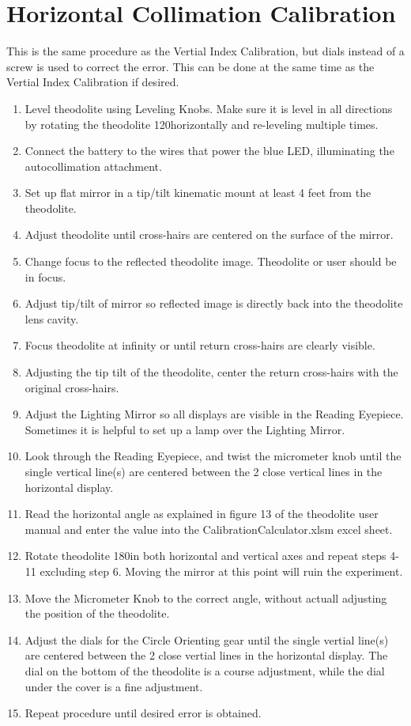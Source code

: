 \documentclass[a4paper,12pt]{article}
\begin{document}
\section*{Horizontal Collimation Calibration}
    This is the same procedure as the Vertial Index Calibration, but dials instead of a screw is used to correct the error. This can be done at the same time as the Vertial Index Calibration if desired.
    \begin{enumerate}
    \item Level theodolite using Leveling Knobs. Make sure it is level in all directions by rotating the theodolite 120\degree horizontally and re-leveling multiple times.
	\item Connect the battery to the wires that power the blue LED, illuminating the autocollimation attachment.
	\item Set up flat mirror in a tip/tilt kinematic mount  at least 4 feet from the theodolite.
	\item Adjust theodolite until cross-hairs are centered on the surface of the mirror.
	\item Change focus to the reflected theodolite image. Theodolite or user should be in focus.
	\item Adjust tip/tilt of mirror so reflected image is directly back into the theodolite lens cavity.
	\item Focus theodolite at infinity or until return cross-hairs are clearly visible.
	\item Adjusting the tip tilt of the theodolite, center the return cross-hairs with the original cross-hairs.
	\item Adjust the Lighting Mirror so all displays are visible in the Reading Eyepiece. Sometimes it is helpful to set up a lamp over the Lighting Mirror.
	\item Look through the Reading Eyepiece, and twist the micrometer knob until the single vertical line(s) are centered between the 2 close vertical lines in the horizontal display.
	\item Read the horizontal angle as explained in figure 13 of the theodolite user manual and enter the value into the CalibrationCalculator.xlsm excel sheet.
	\item Rotate theodolite 180\degree in both horizontal and vertical axes and repeat steps 4-11 excluding step 6. Moving the mirror at this point will ruin the experiment.
	\item Move the Micrometer Knob to the correct angle, without actuall adjusting the position of the theodolite.
	\item Adjust the dials for the Circle Orienting gear until the single vertial line(s) are centered between the 2 close vertial lines in the horizontal display. The dial on the bottom of the theodolite is a course adjustment, while the dial under the cover is a fine adjustment.
	\item Repeat procedure until desired error is obtained.
    \end{enumerate}
\end{document}
